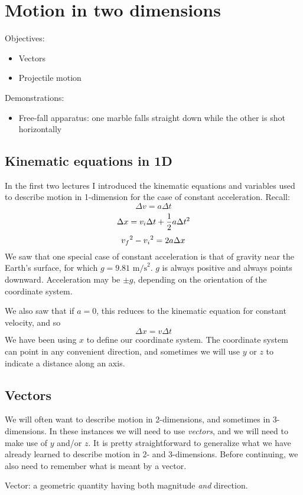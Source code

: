 \section{Motion in two dimensions}
Objectives:
\begin{itemize}
\item Vectors
\item Projectile motion
\end{itemize}

Demonstrations:
\begin{itemize}
\item Free-fall apparatus: one marble falls straight down while the other is shot horizontally
\end{itemize}

\subsection{Kinematic equations in 1D}
In the first two lectures I introduced the kinematic equations and variables used to describe motion in 1-dimension for the case of constant acceleration. Recall:
$$\Delta{v}=a\Delta{t}$$
$$\Delta{x}=v_i\Delta{t}+\frac{1}{2}a\Delta{t}\displaystyle^2$$
$$v_f\displaystyle^2-v_i\displaystyle^2=2a\Delta{x}$$
We saw that one special case of constant acceleration is that of gravity near the Earth's surface, for which $g=9.81\mbox{ m/s}^2$. $g$ is always positive and always points downward. Acceleration may be $\pm g$, depending on the orientation of the coordinate system.

We also saw that if $a=0$, this reduces to the kinematic equation for constant velocity, and so
$$\Delta{x}=v\Delta{t}$$
We have been using $x$ to define our coordinate system. The coordinate system can point in any convenient direction, and sometimes we will use $y$ or $z$ to indicate a distance along an axis.

\subsection{Vectors}
We will often want to describe motion in 2-dimensions, and sometimes in 3-dimensions. In these instances we will need to use \textit{vectors}, and we will need to make use of $y$ and/or $z$. It is pretty straightforward to generalize what we have already learned to describe motion in 2- and 3-dimensions. Before continuing, we also need to remember what is meant by a vector.

Vector: a geometric quantity having both magnitude \textit{and} direction.

